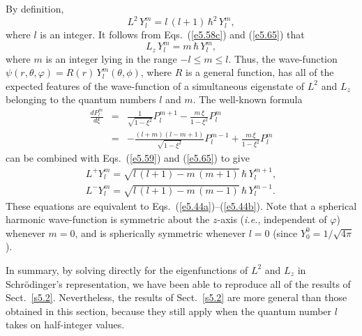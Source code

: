 By definition,
\begin{equation}\label{e5.69}
L^2 \,Y_l^m = l\,(l+1)\,\hbar^2\,Y_l^m,
\end{equation}
where $l$ is an integer.
It follows from Eqs.~(\ref{e5.58c}) and (\ref{e5.65}) that
\begin{equation}
L_z \,Y^m_l = m\,\hbar\,Y_l^m,
\end{equation}
where $m$ is an integer lying in the range $-l\leq m \leq l$. Thus, the
wave-function $\psi(r, \theta, \varphi) = R(r) \,Y_l^m(\theta, \phi)$, where
$R$ is a general function,  has
all of the expected features of the wave-function 
of a simultaneous eigenstate of $L^2$ and $L_z$
belonging to the quantum numbers $l$ and $m$. The well-known formula
\begin{eqnarray}
\frac{d P_l^m}{d\xi} &=& \frac{1}{\sqrt{1-\xi^2}}P_l^{m+1}
- \frac{m\,\xi}{1-\xi^2} P_l^m \nonumber\\[0.5ex]
&=& - \frac{(l+m)(l-m+1)}{\sqrt{1-\xi^2}}P_l^{m-1} + \frac{m\,\xi}
{1-\xi^2} P_l^m
\end{eqnarray}
can be combined with Eqs.~(\ref{e5.59}) and (\ref{e5.65}) to give
\begin{eqnarray}
L^+ Y_l^m = \sqrt{l\,(l+1)- m\,(m+1)}\,\hbar\,Y_l^{m+1},\\[0.5ex]
L^- Y_l^m = \sqrt{l\,(l+1) - m \,(m-1)} \,\hbar \,Y_l^{m-1}.
\end{eqnarray}
These equations are equivalent to Eqs.~(\ref{e5.44a})--(\ref{e5.44b}). Note that a spherical
harmonic  wave-function
is symmetric about the $z$-axis ({\em i.e.}, independent of $\varphi$) whenever
$m=0$, and is spherically symmetric whenever $l=0$ (since
$Y_0^0 = 1/\sqrt{4\pi}$). 

In summary, by solving directly
for the 
eigenfunctions of $L^2$ and $L_z$  in Schr\"{o}d\-inger's representation, we have been able to reproduce
all of the results of Sect.~\ref{s5.2}. Nevertheless, the results of Sect.~\ref{s5.2}
are more general than those obtained in this section, because they still apply
when the quantum number $l$ takes on half-integer values. 

